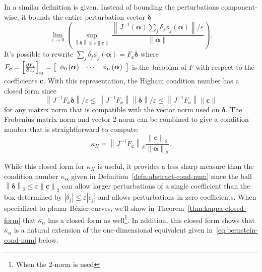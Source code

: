 \documentclass[3p, authoryear, square]{elsarticle}
\theoremstyle{definition}
\newcommand{\eps}{\varepsilon}
\begin{document}
In \cite[Chapter~25, Section 25.4]{Higham2002} a similar definition is
given. Instead of bounding the perturbations component-wise, it bounds
the entire perturbation vector \(\bm{\delta}\)
\begin{equation}
  \lim_{\eps \to 0} \left(\sup_{\left \lVert \bm{\delta} \right \rVert \leq
  \eps \left \lVert \bm{c} \right \rVert} \frac{\left \lVert
  J^{-1}\left(\bm{\alpha}\right) \sum_j \delta_j
  \phi_j\left(\bm{\alpha}\right) \right \rVert / \eps}{
  \left \lVert \bm{\alpha} \right \rVert}\right).
\end{equation}
It's possible to rewrite \(\sum_j \delta_j \phi_j\left(\bm{\alpha}\right) =
F_{\bm{c}} \bm{\delta}\) where \(F_{\bm{c}} =
\left[\frac{\partial F_i}{\partial c_j}\right]_{ij} =
\left[\begin{array}{c c c} \phi_0\left(\bm{\alpha}\right) & \cdots &
\phi_n\left(\bm{\alpha}\right) \end{array}\right]\) is the Jacobian of \(F\)
with respect to the coefficients \(\bm{c}\). With this representation, the
Higham condition number has a closed form since
\begin{equation}
  \left \lVert
  J^{-1} F_{\bm{c}} \bm{\delta} \right \rVert / \eps \leq
  \left \lVert J^{-1} F_{\bm{c}} \right \rVert \left \lVert \bm{\delta} \right
  \rVert / \eps \leq \left \lVert J^{-1} F_{\bm{c}} \right \rVert \left \lVert
  \bm{c} \right \rVert
\end{equation}
for any matrix norm that is compatible with the vector norm used on
\(\bm{\delta}\). The Frobenius matrix norm and vector 2-norm can be
combined to give a condition number that is straightforward to compute:
\begin{equation}\label{eq:higham-cond-num}
  \kappa_H = \left \lVert J^{-1} F_{\bm{c}} \right \rVert_F
  \frac{\left \lVert \bm{c}
  \right \rVert_2}{\left \lVert \bm{\alpha} \right \rVert_2}.
\end{equation}

While this closed form for \(\kappa_H\) is useful, it provides a less sharp
measure than the condition number \(\kappa_{\bm{\alpha}}\) given in
Definition~\ref{defn:abstract-cond-num} since the ball \(\left \lVert
\bm{\delta} \right \rVert_2 \leq \eps \left \lVert \bm{c} \right \rVert_2\)
can allow larger perturbations of a single coefficient than the box determined
by \(\left|\delta_j\right| \leq \eps \left|c_j\right|\) and allows
perturbations in zero coefficients.
When specialized to planar B\'{e}zier curves, we'll show in
Theorem~\ref{thm:kappa-closed-form} that \(\kappa_{\alpha}\) has a closed form
as well\footnote{When the 2-norm is used}. In addition, this closed
form shows that \(\kappa_{\alpha}\) is a natural extension of the
one-dimensional equivalent given in~\eqref{eq:bernstein-cond-num} below.
\end{document}
